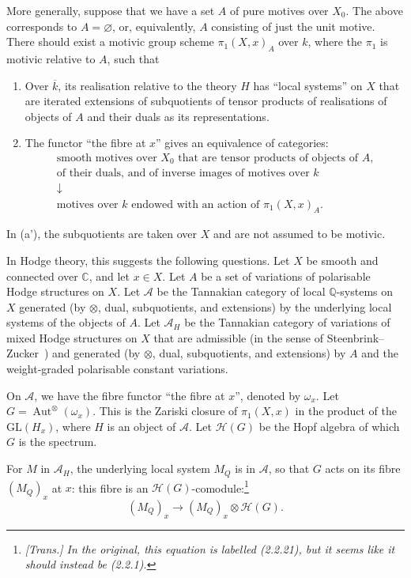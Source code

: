 \documentclass{article}
\theoremstyle{plain}
\theoremstyle{definition}
\newcommand{\scr}[1]{{\mathscr{#1}}}
\newcommand{\QQ}{\mathbb{Q}}
\newcommand{\CC}{\mathbb{C}}
\newcommand{\GL}{\mathrm{GL}}
\DeclareMathOperator{\Aut}{Aut}
\newcommand{\oldpage}[1]{\marginpar{\footnotesize$\Big\vert$ \textit{p.~#1}}}
\begin{document}
More generally, suppose that we have a set $A$ of pure motives over $X_0$.
The above corresponds to $A=\varnothing$, or, equivalently, $A$ consisting of just the unit motive.
There should exist a motivic group scheme $\pi_1(X,x)_A$ over $k$, where the $\pi_1$ is motivic relative to $A$, such that
\begin{enumerate}[(a')]
  \item Over $\overline{k}$, its realisation relative to the theory $H$ has ``local systems'' on $X$ that are iterated extensions of subquotients of tensor products of realisations of objects of $A$ and their duals as its representations.
  \item The functor ``the fibre at $x$'' gives an equivalence of categories:
    \[
      \begin{gathered}
        \mbox{smooth motives over $X_0$ that are tensor products of objects of $A$,}
      \\\mbox{of their duals, and of inverse images of motives over $k$}
      \\\downarrow
      \\\mbox{motives over $k$ endowed with an action of $\pi_1(X,x)_A$.}
      \end{gathered}
    \]
\end{enumerate}

In (a'), the subquotients are taken over $X$ and are not assumed to be motivic.

In Hodge theory, this suggests the following questions.
Let $X$ be smooth and connected over $\CC$, and let $x\in X$.
Let $A$ be a set of variations of polarisable Hodge structures on $X$.
Let $\scr{A}$ be the Tannakian category of local $\QQ$-systems on $X$ generated (by $\otimes$, dual, subquotients, and extensions) by the underlying local systems of the objects of $A$.
Let $\scr{A}_H$ be the Tannakian category of variations of mixed Hodge structures on $X$ that are admissible (in the sense of Steenbrink--Zucker~\cite{30}) and generated (by $\otimes$, dual, subquotients, and extensions) by $A$ and the weight-graded polarisable constant variations.

On $\scr{A}$, we have the fibre functor ``the fibre at $x$'', denoted by $\omega_x$.
Let $G=\Aut^\otimes(\omega_x)$.
This is the Zariski closure of $\pi_1(X,x)$ in the product of the $\GL(H_x)$, where $H$ is an object of $\scr{A}$.
Let $\scr{H}(G)$ be the Hopf algebra of which $G$ is the spectrum.

\oldpage{154}
For $M$ in $\scr{A}_H$, the underlying local system $M_Q$ is in $\scr{A}$, so that $G$ acts on its fibre $(M_Q)_x$ at $x$: this fibre is an $\scr{H}(G)$-comodule:\footnote{\emph{[Trans.] In the original, this equation is labelled (2.2.21), but it seems like it should instead be (2.2.1).}}
\[
\label{2.2.1}
  (M_Q)_x \to (M_Q)_x\otimes\scr{H}(G).
\tag{2.2.1}
\]
\end{document}
